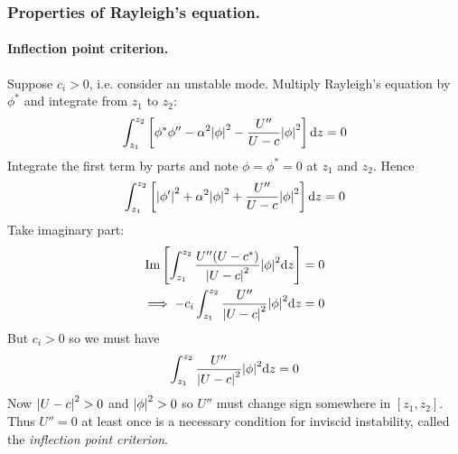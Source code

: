 \documentclass{jknotes}
\begin{document}
\subsubsection{Properties of Rayleigh's equation.}
\paragraph{Inflection point criterion.}
Suppose $c_i > 0$, i.e. consider an unstable mode. Multiply Rayleigh's
equation by $\phi^*$ and integrate from $z_1$ to $z_2$:
\begin{equation}
	\int_{z_1}^{z_2} \left[\phi^* \phi'' - \alpha^2 \abs{\phi}^2 - \frac{U''}{U-c}
	\abs{\phi}^2 \right]\diffd z = 0
\end{equation}
Integrate the first term by parts and note $\phi = \phi^* = 0$ at $z_1$ and
$z_2$. Hence
\begin{equation}
	\int_{z_1}^{z_2} \left[\abs{\phi'}^2  + \alpha^2 \abs{\phi}^2 +
	\frac{U''}{U-c}\abs{\phi}^2 \right] \diffd z =0
\end{equation}
Take imaginary part:
\begin{align}
	\Im \left[ \int_{z_1}^{z_2} \frac{U''(U-c^*)}{\abs{U-c}^2} \abs{\phi}^2
	 \diffd z \right]&= 0 \\
\implies
	-c_i\int_{z_1}^{z_2} \frac{U''}{\abs{U-c}^2} \abs{\phi}^2
	\diffd z &= 0
\end{align}
But $c_i > 0$ so we must have
\begin{equation}
\int_{z_1}^{z_2} \frac{U''}{\abs{U-c}^2} \abs{\phi}^2
	\diffd z  = 0
\end{equation}
Now $\abs{U-c}^2 > 0$ and $\abs{\phi}^2 > 0 $ so $U''$ must change sign
somewhere in $\left[z_1,z_2\right]$. Thus $U''=0$ at least once is a necessary
condition for inviscid instability, called the \emph{inflection point
criterion}.
\end{document}
